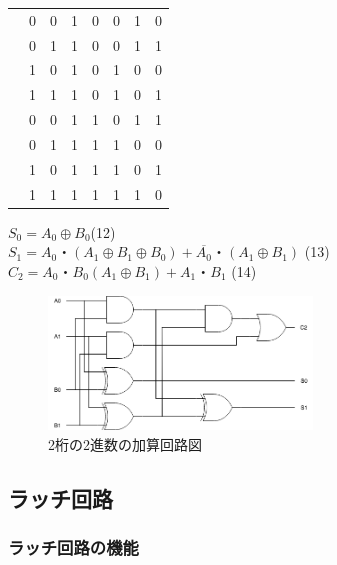 \documentclass[twocolumn, 10pt,a4j]{jsarticle}
\begin{document}
\begin{enumerate}
\begin{table}[H]
\begin{tabular}{l|llll|lll}
            & 0       & 0       & 1       & 0       & 0       & 1       & 0       \\
            & 0       & 1       & 1       & 0       & 0       & 1       & 1       \\
            & 1       & 0       & 1       & 0       & 1       & 0       & 0       \\
            & 1       & 1       & 1       & 0       & 1       & 0       & 1       \\
            & 0       & 0       & 1       & 1       & 0       & 1       & 1       \\
            & 0       & 1       & 1       & 1       & 1       & 0       & 0       \\
            & 1       & 0       & 1       & 1       & 1       & 0       & 1       \\
            & 1       & 1       & 1       & 1       & 1       & 1       & 0      
        \end{tabular}
      \end{table}
      $S_{0} = A_{0} \oplus B_{0} $\quad(12) \\
      $S_{1} = A_{0}・(A_{1} \oplus B_{1} \oplus B_{0}) + \overline{A_{0}}・(A_{1} \oplus B_{1})$ \quad(13) \\
      $C_{2} = A_{0}・B_{0}(A_{1} \oplus B_{1}) + A_{1}・B_{1}$ \quad(14) \\
      \begin{figure}[H]
        \begin{center}
          \includegraphics[width=7cm]{../img/half_adder/ronri.png}
          \caption{2桁の2進数の加算回路図}
        \end{center}
      \end{figure}

    \end{enumerate}
\subsection{ラッチ回路}
  \subsubsection{ラッチ回路の機能}
\end{document}
